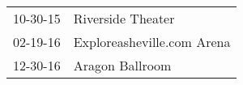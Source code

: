\begin{supertabular}{p{0.25\columnwidth}p{0.75\columnwidth}}
 10-30-15 &           Riverside Theater \\
 02-19-16 &  Exploreasheville.com Arena \\
 12-30-16 &             Aragon Ballroom \\
\end{supertabular}
